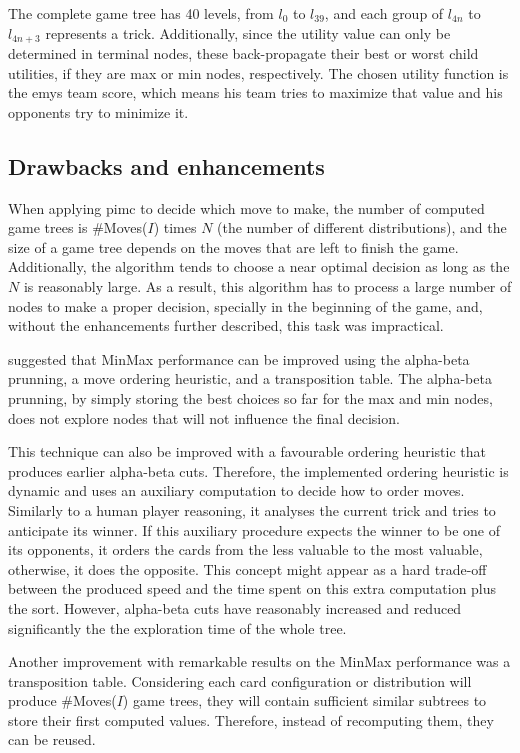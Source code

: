 The complete game tree has 40 levels, from $l_{0}$ to $l_{39}$, and each group of $l_{4n}$ to $l_{4n+3}$ represents a trick.
Additionally, since the utility value can only be determined in terminal nodes, these back-propagate their best or worst child utilities, if they are max or min nodes, respectively.
The chosen utility function is the \ac{emys} team score, which means his team tries to maximize that value and his opponents try to minimize it.


\subsection{Drawbacks and enhancements}

When applying \ac{pimc} to decide which move to make, the number of computed game trees is \#Moves($I$) times $N$ (the number of different distributions), and the size of a game tree depends on the moves that are left to finish the game.
Additionally, the algorithm tends to choose a near optimal decision as long as the $N$ is reasonably large.
As a result, this algorithm has to process a large number of nodes to make a proper decision, specially in the beginning of the game, and, without the enhancements further described, this task was impractical.

\citet*{Russell2009} suggested that MinMax performance can be improved using the alpha-beta prunning, a move ordering heuristic, and a transposition table.
The alpha-beta prunning, by simply storing the best choices so far for the max and min nodes, does not explore nodes that will not influence the final decision.

This technique can also be improved with a favourable ordering heuristic that produces earlier alpha-beta cuts.
Therefore, the implemented ordering heuristic is dynamic and uses an auxiliary computation to decide how to order moves.
Similarly to a human player reasoning, it analyses the current trick and tries to anticipate its winner.
If this auxiliary procedure expects the winner to be one of its opponents, it orders the cards from the less valuable to the most valuable, otherwise, it does the opposite.
This concept might appear as a hard trade-off between the produced speed and the time spent on this extra computation plus the sort.
However, alpha-beta cuts have reasonably increased and reduced significantly the the exploration time of the whole tree.

Another improvement with remarkable results on the MinMax performance was a transposition table.
Considering each card configuration or distribution will produce \#Moves($I$) game trees, they will contain sufficient similar subtrees to store their first computed values.
Therefore, instead of recomputing them, they can be reused.

